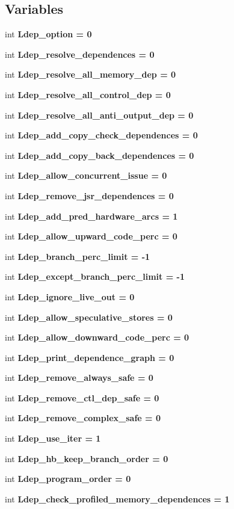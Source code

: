 \subsection*{Variables}
\begin{CompactItemize}
\item 
int \bf{Ldep\_\-option} = 0
\item 
int \bf{Ldep\_\-resolve\_\-dependences} = 0
\item 
int \bf{Ldep\_\-resolve\_\-all\_\-memory\_\-dep} = 0
\item 
int \bf{Ldep\_\-resolve\_\-all\_\-control\_\-dep} = 0
\item 
int \bf{Ldep\_\-resolve\_\-all\_\-anti\_\-output\_\-dep} = 0
\item 
int \bf{Ldep\_\-add\_\-copy\_\-check\_\-dependences} = 0
\item 
int \bf{Ldep\_\-add\_\-copy\_\-back\_\-dependences} = 0
\item 
int \bf{Ldep\_\-allow\_\-concurrent\_\-issue} = 0
\item 
int \bf{Ldep\_\-remove\_\-jsr\_\-dependences} = 0
\item 
int \bf{Ldep\_\-add\_\-pred\_\-hardware\_\-arcs} = 1
\item 
int \bf{Ldep\_\-allow\_\-upward\_\-code\_\-perc} = 0
\item 
int \bf{Ldep\_\-branch\_\-perc\_\-limit} = -1
\item 
int \bf{Ldep\_\-except\_\-branch\_\-perc\_\-limit} = -1
\item 
int \bf{Ldep\_\-ignore\_\-live\_\-out} = 0
\item 
int \bf{Ldep\_\-allow\_\-speculative\_\-stores} = 0
\item 
int \bf{Ldep\_\-allow\_\-downward\_\-code\_\-perc} = 0
\item 
int \bf{Ldep\_\-print\_\-dependence\_\-graph} = 0
\item 
int \bf{Ldep\_\-remove\_\-always\_\-safe} = 0
\item 
int \bf{Ldep\_\-remove\_\-ctl\_\-dep\_\-safe} = 0
\item 
int \bf{Ldep\_\-remove\_\-complex\_\-safe} = 0
\item 
int \bf{Ldep\_\-use\_\-iter} = 1
\item 
int \bf{Ldep\_\-hb\_\-keep\_\-branch\_\-order} = 0
\item 
int \bf{Ldep\_\-program\_\-order} = 0
\item 
int \bf{Ldep\_\-check\_\-profiled\_\-memory\_\-dependences} = 1
\item 

\end{CompactItemize}
